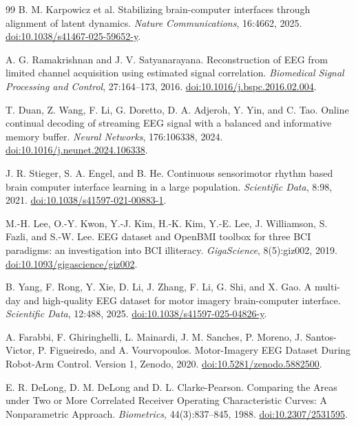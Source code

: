 \documentclass[11pt,a4paper]{article}
\begin{document}
\begin{thebibliography}{99}
B. M. Karpowicz et al.
Stabilizing brain-computer interfaces through alignment of latent dynamics.
\emph{Nature Communications}, 16:4662, 2025.
\href{https://doi.org/10.1038/s41467-025-59652-y}{doi:10.1038/s41467-025-59652-y}.

A. G. Ramakrishnan and J. V. Satyanarayana.
Reconstruction of EEG from limited channel acquisition using estimated signal correlation.
\emph{Biomedical Signal Processing and Control}, 27:164--173, 2016.
\href{https://doi.org/10.1016/j.bspc.2016.02.004}{doi:10.1016/j.bspc.2016.02.004}.

T. Duan, Z. Wang, F. Li, G. Doretto, D. A. Adjeroh, Y. Yin, and C. Tao.
Online continual decoding of streaming EEG signal with a balanced and informative memory buffer.
\emph{Neural Networks}, 176:106338, 2024.
\href{https://doi.org/10.1016/j.neunet.2024.106338}{doi:10.1016/j.neunet.2024.106338}.

J. R. Stieger, S. A. Engel, and B. He.
Continuous sensorimotor rhythm based brain computer interface learning in a large population.
\emph{Scientific Data}, 8:98, 2021.
\href{https://doi.org/10.1038/s41597-021-00883-1}{doi:10.1038/s41597-021-00883-1}.

M.-H. Lee, O.-Y. Kwon, Y.-J. Kim, H.-K. Kim, Y.-E. Lee, J. Williamson, S. Fazli, and S.-W. Lee.
EEG dataset and OpenBMI toolbox for three BCI paradigms: an investigation into BCI illiteracy.
\emph{GigaScience}, 8(5):giz002, 2019.
\href{https://doi.org/10.1093/gigascience/giz002}{doi:10.1093/gigascience/giz002}.

B. Yang, F. Rong, Y. Xie, D. Li, J. Zhang, F. Li, G. Shi, and X. Gao.
A multi-day and high-quality EEG dataset for motor imagery brain-computer interface.
\emph{Scientific Data}, 12:488, 2025.
\href{https://doi.org/10.1038/s41597-025-04826-y}{doi:10.1038/s41597-025-04826-y}.

A. Farabbi, F. Ghiringhelli, L. Mainardi, J. M. Sanches, P. Moreno, J. Santos-Victor, P. Figueiredo, and A. Vourvopoulos.
Motor-Imagery EEG Dataset During Robot-Arm Control. Version 1, Zenodo, 2020.
\href{https://doi.org/10.5281/zenodo.5882500}{doi:10.5281/zenodo.5882500}.

E. R. DeLong, D. M. DeLong and D. L. Clarke-Pearson.
Comparing the Areas under Two or More Correlated Receiver Operating Characteristic Curves: A Nonparametric Approach.
\emph{Biometrics}, 44(3):837--845, 1988.
\href{https://doi.org/10.2307/2531595}{doi:10.2307/2531595}.


\end{thebibliography}
\end{document}

